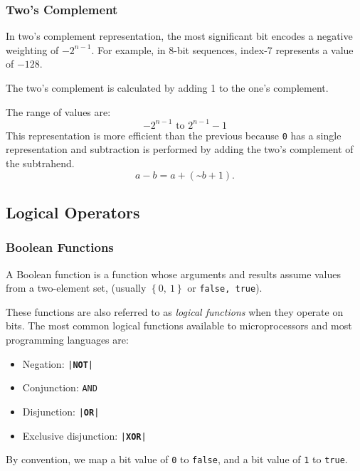 \documentclass{article}
\newcommand{\keyword}[1]{\textcolor[rgb]{0.00,0.50,0.00}{\textbf{#1}}}
\begin{document}
\subsubsection{Two's Complement}
In two's complement representation, the most significant bit encodes a negative weighting of
\(-2^{n - 1}\). For example, in 8-bit sequences, index-7 represents a value of \(-128\).

The two's complement is calculated by adding 1 to the one's complement.

The range of values are:
\begin{equation*}
    -2^{n - 1} \text{ to } 2^{n - 1} - 1
\end{equation*}
This representation is more efficient than the previous because \texttt{0} has a single representation
and subtraction is performed by adding the two's complement of the subtrahend.
\begin{equation*}
    a - b = a + \left( \text{\textasciitilde} b + 1 \right).
\end{equation*}
\subsection{Logical Operators}
\subsubsection{Boolean Functions}
A Boolean function is a function whose arguments and results assume values
from a two-element set, (usually \(\left\{ 0,\: 1 \right\}\) or \texttt{{false, true}}).

These functions are also referred to as \textit{logical functions} when they operate on bits.
The most common logical functions available to microprocessors and most programming languages are:
\begin{itemize}
    \item Negation: \texttt{|\keyword{NOT}|}
    \item Conjunction: \texttt{AND}
    \item Disjunction: \texttt{|\keyword{OR}|}
    \item Exclusive disjunction: \texttt{|\keyword{XOR}|}
\end{itemize}
By convention, we map a bit value of \texttt{0} to \texttt{false}, and a bit value of \texttt{1} to \texttt{true}.
\end{document}
